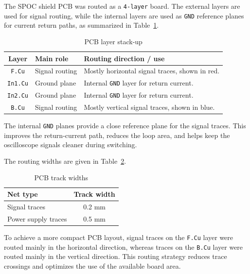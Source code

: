 The SPOC shield PCB was routed as a \texttt{4-layer} board. The external layers are used for signal routing, 
while the internal layers are used as \texttt{GND} reference planes for current return paths, as summarized in
Table~\ref{tab:pcb_layers}.

\begin{table}[H]
\centering
\caption{PCB layer stack-up}
\label{tab:pcb_layers}
\begin{tabular}{|c|l|p{7cm}|}
\hline
\textbf{Layer} & \textbf{Main role} & \textbf{Routing direction / use} \\ \hline
\texttt{F.Cu} & Signal routing & Mostly horizontal signal traces, shown in red. \\ \hline
\texttt{In1.Cu} & Ground plane & Internal \texttt{GND} layer for return current. \\ \hline
\texttt{In2.Cu} & Ground plane & Internal \texttt{GND} layer for return current. \\ \hline
\texttt{B.Cu} & Signal routing & Mostly vertical signal traces, shown in blue. \\ \hline
\end{tabular}
\end{table}

The internal \texttt{GND} planes provide a close reference plane for the signal traces. 
This improves the return-current path, reduces the loop area, and helps keep the oscilloscope signals cleaner during switching.

\vspace{1 cm}
The routing widths are given in Table~\ref{tab:track_widths}.

\begin{table}[H]
\centering
\caption{PCB track widths}
\label{tab:track_widths}
\begin{tabular}{|l|c|}
\hline
\textbf{Net type} & \textbf{Track width} \\ \hline
Signal traces & 0.2 mm \\ \hline
Power supply traces & 0.5 mm \\ \hline
\end{tabular}
\end{table}

To achieve a more compact PCB layout, 
signal traces on the \texttt{F.Cu} layer were routed mainly in the horizontal direction, 
whereas traces on the \texttt{B.Cu} layer were routed mainly in the vertical direction. 
This routing strategy reduces trace crossings and optimizes the use of the available board area.



